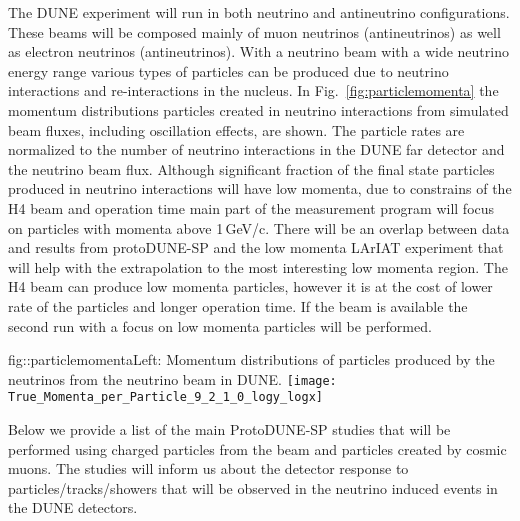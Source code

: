 The DUNE experiment will run in both neutrino and antineutrino 
configurations. These beams will be composed mainly of muon neutrinos (antineutrinos) as well as electron neutrinos (antineutrinos). With a neutrino beam with a wide neutrino energy range various types of particles can be produced due to neutrino interactions and re-interactions in the nucleus.  In Fig.~\ref{fig:particlemomenta} the momentum distributions particles created in 
neutrino interactions from simulated beam fluxes, including oscillation effects, are shown.  The particle rates are normalized  to the number of neutrino interactions in 
the DUNE far detector and the neutrino beam flux.  Although significant fraction of the final state particles produced in neutrino interactions  will have low momenta, due to constrains of the H4 beam and operation time main part of the measurement program will focus on particles with momenta above 1\,GeV/c. There will be an overlap between data and results from protoDUNE-SP and the low momenta LArIAT experiment that will help with the extrapolation to the most interesting low momenta region.  The H4 beam can produce low momenta particles, however it is at the cost of lower rate of the particles and longer operation time. If the beam is available the second run with a focus on  low momenta particles will be performed. 


\begin{cdrfigure} {fig::particlemomenta}{Left: Momentum distributions of particles produced by the neutrinos from the neutrino beam in DUNE. } 
  \texttt{[image: True\_Momenta\_per\_Particle\_9\_2\_1\_0\_logy\_logx]}
\end{cdrfigure}

Below  we provide a list of the main ProtoDUNE-SP studies that will be performed using charged particles from the beam and particles created by cosmic muons. The studies will inform us about the detector response to particles/tracks/showers that will be observed in the neutrino induced events in the DUNE detectors. 

